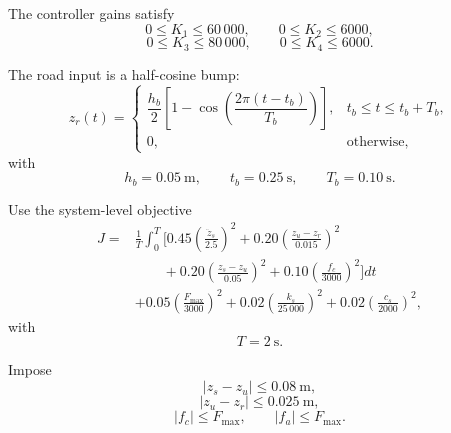 The controller gains satisfy
\begin{equation}
0\leq K_1\leq60\,000,
\qquad
0\leq K_2\leq6000,
\end{equation}
\begin{equation}
0\leq K_3\leq80\,000,
\qquad
0\leq K_4\leq6000.
\end{equation}

The road input is a half-cosine bump:
\begin{equation}
z_r(t)
=
\begin{cases}
\dfrac{h_b}{2}
\left[
1-\cos
\left(
\dfrac{2\pi(t-t_b)}{T_b}
\right)
\right],
&
t_b\leq t\leq t_b+T_b,
\\[1em]
0,
&
\text{otherwise},
\end{cases}
\end{equation}
with
\begin{equation}
h_b=0.05~\mathrm{m},
\qquad
t_b=0.25~\mathrm{s},
\qquad
T_b=0.10~\mathrm{s}.
\end{equation}

Use the system-level objective
\begin{align}
J
=&
\frac{1}{T}
\int_0^T
\Bigg[
0.45
\left(
\frac{\ddot{z}_s}{2.5}
\right)^2
+
0.20
\left(
\frac{z_u-z_r}{0.015}
\right)^2
\nonumber\\
&\qquad
+
0.20
\left(
\frac{z_s-z_u}{0.05}
\right)^2
+
0.10
\left(
\frac{f_c}{3000}
\right)^2
\Bigg]dt
\nonumber\\
&+
0.05
\left(
\frac{F_{\max}}{3000}
\right)^2
+
0.02
\left(
\frac{k_s}{25\,000}
\right)^2
+
0.02
\left(
\frac{c_s}{2000}
\right)^2,
\end{align}
with
\begin{equation}
T=2~\mathrm{s}.
\end{equation}

Impose
\begin{equation}
|z_s-z_u|\leq0.08~\mathrm{m},
\end{equation}
\begin{equation}
|z_u-z_r|\leq0.025~\mathrm{m},
\end{equation}
\begin{equation}
|f_c|\leq F_{\max},
\qquad
|f_a|\leq F_{\max}.
\end{equation}

